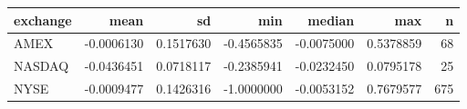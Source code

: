 
\begin{tabular}{lrrrrrr}
\toprule
exchange & mean & sd & min & median & max & n\\
\midrule
AMEX & -0.0006130 & 0.1517630 & -0.4565835 & -0.0075000 & 0.5378859 & 68\\
NASDAQ & -0.0436451 & 0.0718117 & -0.2385941 & -0.0232450 & 0.0795178 & 25\\
NYSE & -0.0009477 & 0.1426316 & -1.0000000 & -0.0053152 & 0.7679577 & 675\\
\bottomrule
\end{tabular}
